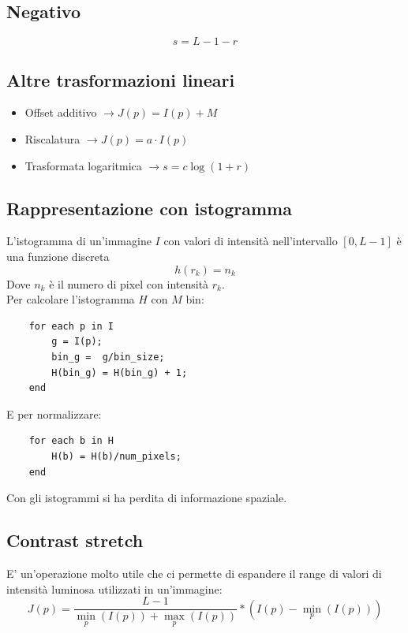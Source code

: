 \documentclass[12pt, a4paper]{report}
\begin{document}
\subsection{Negativo}
\begin{equation*}
    s = L-1-r
\end{equation*}
\subsection{Altre trasformazioni lineari}
\begin{itemize}
    \item Offset additivo $\rightarrow J(p)=I(p)+M$
    \item Riscalatura $\rightarrow J(p)=a\cdot I(p)$
    \item Trasformata logaritmica $\rightarrow s=c\log(1+r)$
\end{itemize}
\subsection{Rappresentazione con istogramma}
L'istogramma di un'immagine $I$ con valori di intensità nell'intervallo $[0,L-1]$ è una funzione discreta
\begin{equation*}
    h(r_{k}) = n_{k}
\end{equation*}
Dove $n_{k}$ è il numero di pixel con intensità $r_{k}$.\\
Per calcolare l'istogramma $H$ con $M$ bin:
\begin{lstlisting}
    for each p in I
        g = I(p);
        bin_g =  g/bin_size;
        H(bin_g) = H(bin_g) + 1;
    end
\end{lstlisting}
E per normalizzare:
\begin{lstlisting}
    for each b in H
        H(b) = H(b)/num_pixels;
    end
\end{lstlisting}
Con gli istogrammi si ha perdita di informazione spaziale.
\subsection{Contrast stretch}
E' un'operazione molto utile che ci permette di espandere il range di valori di intensità luminosa utilizzati in un'immagine:
\begin{equation*}
    J(p) = \frac{L-1}{\min_{p}(I(p))+\max_{p}(I(p))} * \left(I(p)-\min_{p}(I(p))\right)
\end{equation*}
\end{document}
